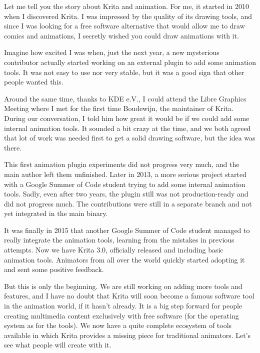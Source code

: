 

\noindent{}Let me tell you the story about Krita and animation. For me, it started in 2010 when I discovered Krita. I was impressed by the quality of its drawing tools, and since I was looking for a free software alternative that would allow me to draw comics and animations, I secretly wished you could draw animations with it. 

Imagine how excited I was when, just the next year, a new mysterious contributor actually started working on an external plugin to add some animation tools. It was not easy to use nor very stable, but it was a good sign that other people wanted this. 

Around the same time, thanks to KDE e.V., I could attend the Libre Graphics Meeting where I met for the first time Boudewijn, the maintainer of Krita. During our conversation, I told him how great it would be if we could add some internal animation tools. It sounded a bit crazy at the time, and we both agreed that lot of work was needed first to get a solid drawing software, but the idea was there.

This first animation plugin experiments did not progress very much, and the main author left them unfinished. Later in 2013, a more serious project started with a Google Summer of Code student trying to add some internal animation tools. Sadly, even after two years, the plugin still was not production-ready and did not progress much. The contributions were still in a separate branch and not yet integrated in the main binary.

It was finally in 2015 that another Google Summer of Code student managed to really integrate the animation tools, learning from the mistakes in previous attempts. Now we have Krita 3.0, officially released and including basic animation tools. Animators from all over the world quickly started adopting it and sent some positive feedback.

But this is only the beginning. We are still working on adding more tools and features, and I have no doubt that Krita will soon become a famous software tool in the animation world, if it hasn't already. It is a big step forward for people creating multimedia content exclusively with free software (for the operating system as for the tools). We now have a quite complete ecosystem of tools available in which Krita provides a missing piece for traditional animators. Let's see what people will create with it.


